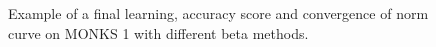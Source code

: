 \begin{appendices}
\begin{figure}[H]
\begin{subfigure}{0.4\textwidth}
                    \label{fig:monks_1_ACC_CGD}
                \end{subfigure}
                \begin{subfigure}{0.4\textwidth}
                    \caption{}
                    \label{fig:monks_1_NORM_CGD}
                \end{subfigure}
                \caption{Example of a final learning, accuracy score and convergence of norm curve on MONKS 1 with different beta methods.}
                \label{fig:monks_1_CGD}
            \end{figure}


\end{appendices}
